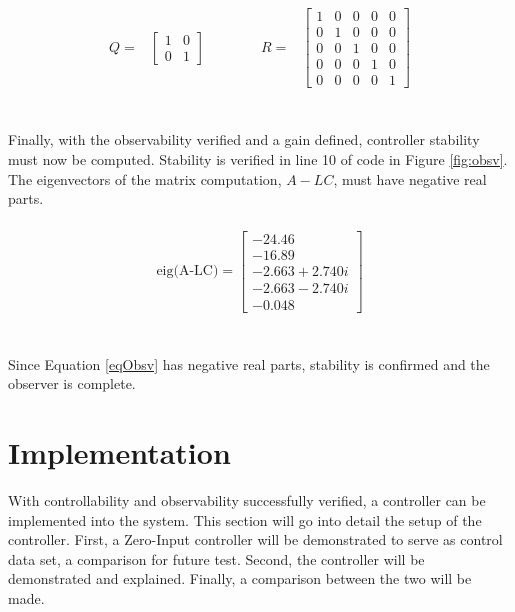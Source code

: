\documentclass[12pt]{article}
\begin{document}
\begin{equation}
\begin{aligned}
\label{qnro}
Q =& 
\begin{bmatrix} 1 & 0 \\ 0 & 1\end{bmatrix}
\qquad \qquad
R =&
\begin{bmatrix} 1 & 0 & 0 & 0 & 0\\ 0 & 1 & 0 & 0 & 0 \\ 0 & 0 & 1 & 0 & 0 \\ 0 & 0 & 0 & 1 & 0 \\ 0 & 0 & 0 & 0 & 1\end{bmatrix}
\end{aligned}
\end{equation}
\\ \\
Finally, with the observability verified and a gain defined, controller stability must now be computed. Stability is verified in line 10 of code in Figure \ref{fig:obsv}. The eigenvectors of the matrix computation,  $A-LC$, must have negative real parts.
\\ \\
\begin{equation} \label{eqObsv} \begin{aligned}
\textrm{eig(A-LC)} = \begin{bmatrix}
-24.46\\ -16.89\\ -2.663 + 2.740i\\ -2.663 - 2.740i\\ -0.048
\end{bmatrix} \end{aligned} \end{equation}
\\ \\
Since Equation \eqref{eqObsv} has negative real parts, stability is confirmed and the observer is complete.
\section{Implementation}
With controllability and observability successfully verified, a controller can be implemented into the system. This section will go into detail the setup of the controller. First, a Zero-Input controller will be demonstrated to serve as control data set, a comparison for future test. Second, the controller will be demonstrated and explained. Finally, a comparison between the two will be made.
\end{document}
